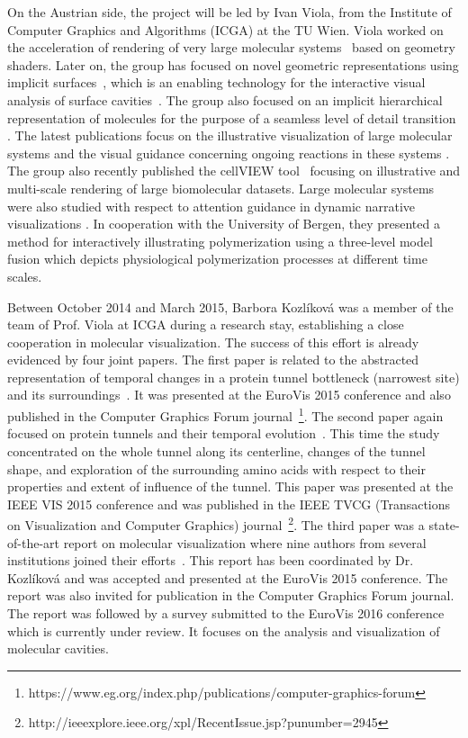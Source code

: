 \documentclass[11pt,a4paper,titlepage,oneside,onecolumn]{article}
\begin{document}
On the Austrian side, the project will be led by Ivan Viola, from the Institute of Computer Graphics and Algorithms (ICGA) at the TU Wien. 
Viola worked on the acceleration of rendering of very large molecular systems~\cite{lampe} based on geometry shaders. 
Later on, the group has focused on novel geometric representations using implicit surfaces~\cite{ParulekViola2012}, which is an enabling technology for the interactive visual analysis of surface cavities~\cite{parulek2012implicit,parulek13visualanalysis}. 
The group also focused on an implicit hierarchical representation of molecules for the purpose of a seamless level of detail transition \cite{parulek13seamless}.
The latest publications focus on the illustrative visualization of large molecular systems and the visual guidance concerning ongoing reactions in these systems \cite{Muzic2014}.
The group also recently published the cellVIEW tool~\cite{cellview} focusing on illustrative and multi-scale rendering  of large biomolecular datasets. 
Large molecular systems were also studied with respect to attention guidance in dynamic narrative visualizations \cite{waldner}. 
In cooperation with the University of Bergen, they presented a method for interactively illustrating polymerization using a three-level model fusion \cite{kolesar} which depicts physiological polymerization processes at different time scales.
 
Between October 2014 and March 2015, Barbora Kozl\'{i}kov\'{a} was a member of the team of Prof. Viola at ICGA during a research stay, establishing a close cooperation in molecular visualization. 
The success of this effort is already evidenced by four joint papers. 
The first paper is related to the abstracted representation of temporal changes in a protein tunnel bottleneck (narrowest site) and its surroundings~\cite{molecollar}. 
It was presented at the EuroVis 2015 conference and also published in the Computer Graphics Forum journal~\footnote{https://www.eg.org/index.php/publications/computer-graphics-forum}. 
The second paper again focused on protein tunnels and their temporal evolution~\cite{animoamino}.
This time the study concentrated on the whole tunnel along its centerline, changes of the tunnel shape, and exploration of the surrounding amino acids with respect to their properties and extent of influence of the tunnel.
This paper was presented at the IEEE VIS 2015 conference and was published in the IEEE TVCG (Transactions on Visualization and Computer Graphics) journal~\footnote{http://ieeexplore.ieee.org/xpl/RecentIssue.jsp?punumber=2945}.
The third paper was a state-of-the-art report on molecular visualization where nine authors from several institutions joined their efforts~\cite{kozlikova_visualization_2015}. 
This report has been coordinated by Dr. Kozl\'{i}kov\'{a} and was accepted and presented at the EuroVis 2015 conference. The report was also invited for publication in the Computer Graphics Forum journal.
The report was followed by a survey submitted to the EuroVis 2016 conference which is currently under review. 
It focuses on the analysis and visualization of molecular cavities.
\end{document}
